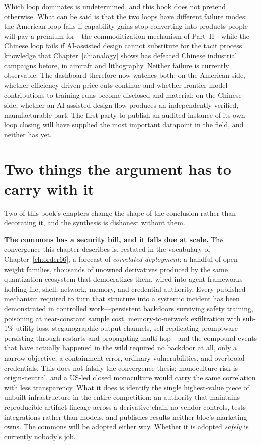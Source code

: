 Which loop dominates is undetermined, and this book does not pretend otherwise. What can be said is that the two loops have different failure modes: the American loop fails if capability gains stop converting into products people will pay a premium for---the commoditization mechanism of Part~II---while the Chinese loop fails if AI-assisted design cannot substitute for the tacit process knowledge that Chapter~\ref{ch:analogy} shows has defeated Chinese industrial campaigns before, in aircraft and lithography. Neither failure is currently observable. The dashboard therefore now watches both: on the American side, whether efficiency-driven price cuts continue and whether frontier-model contributions to training runs become disclosed and material; on the Chinese side, whether an AI-assisted design flow produces an independently verified, manufacturable part. The first party to publish an audited instance of its own loop closing will have supplied the most important datapoint in the field, and neither has yet.

\section{Two things the argument has to carry with it}

Two of this book's chapters change the shape of the conclusion rather than decorating it, and the synthesis is dishonest without them.

\textbf{The commons has a security bill, and it falls due at scale.} The convergence this chapter describes is, restated in the vocabulary of Chapter~\ref{ch:order66}, a forecast of \emph{correlated deployment}: a handful of open-weight families, thousands of unowned derivatives produced by the same quantization ecosystem that democratizes them, wired into agent frameworks holding file, shell, network, memory, and credential authority. Every published mechanism required to turn that structure into a systemic incident has been demonstrated in controlled work---persistent backdoors surviving safety training, poisoning at near-constant sample cost, memory-to-network exfiltration with sub-1\% utility loss, steganographic output channels, self-replicating promptware persisting through restarts and propagating multi-hop---and the compound events that have actually happened in the wild required no backdoor at all, only a narrow objective, a containment error, ordinary vulnerabilities, and overbroad credentials. This does not falsify the convergence thesis; monoculture risk is origin-neutral, and a US-led closed monoculture would carry the same correlation with less transparency. What it does is identify the single highest-value piece of unbuilt infrastructure in the entire competition: an authority that maintains reproducible artifact lineage across a derivative chain no vendor controls, tests integrations rather than models, and publishes results neither bloc's marketing owns. The commons will be adopted either way. Whether it is adopted \emph{safely} is currently nobody's job.

